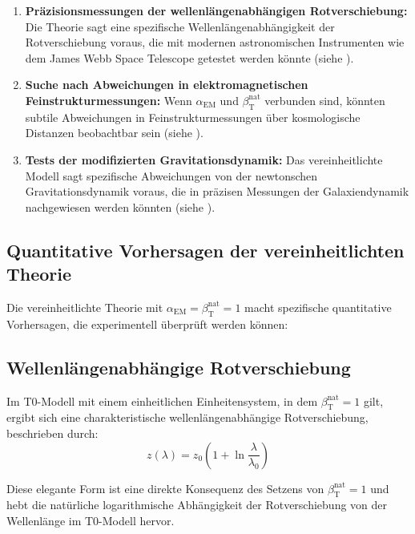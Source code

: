 \documentclass[12pt,a4paper]{article}
\newcommand{\alphaEM}{\alpha_{\text{EM}}}
\newcommand{\betaT}{\beta_{\text{T}}}
\begin{document}
	\begin{enumerate}
		\item \textbf{Präzisionsmessungen der wellenlängenabhängigen Rotverschiebung:} Die Theorie sagt eine spezifische Wellenlängenabhängigkeit der Rotverschiebung voraus, die mit modernen astronomischen Instrumenten wie dem James Webb Space Telescope getestet werden könnte (siehe \cite{pascher_messdifferenzen_2025}).
		
		\item \textbf{Suche nach Abweichungen in elektromagnetischen Feinstrukturmessungen:} Wenn \(\alphaEM\) und \(\betaT^{\text{nat}}\) verbunden sind, könnten subtile Abweichungen in Feinstrukturmessungen über kosmologische Distanzen beobachtbar sein (siehe \cite{pascher_alpha_2025}).
		
		\item \textbf{Tests der modifizierten Gravitationsdynamik:} Das vereinheitlichte Modell sagt spezifische Abweichungen von der newtonschen Gravitationsdynamik voraus, die in präzisen Messungen der Galaxiendynamik nachgewiesen werden könnten (siehe \cite{pascher_galaxies_2025}).
	\end{enumerate}
	
	\subsection{Quantitative Vorhersagen der vereinheitlichten Theorie}
	\label{subsec:quantitative_predictions}
	
	Die vereinheitlichte Theorie mit \(\alphaEM = \betaT^{\text{nat}} = 1\) macht spezifische quantitative Vorhersagen, die experimentell überprüft werden können:
	
	\subsection{Wellenlängenabhängige Rotverschiebung}
	\label{subsec:wavelength_redshift}
	
	Im T0-Modell mit einem einheitlichen Einheitensystem, in dem \(\betaT^{\text{nat}} = 1\) gilt, ergibt sich eine charakteristische wellenlängenabhängige Rotverschiebung, beschrieben durch:
	\begin{equation}
		z(\lambda) = z_0 \left(1 + \ln \frac{\lambda}{\lambda_0}\right)
	\end{equation}
	
	Diese elegante Form ist eine direkte Konsequenz des Setzens von \(\betaT^{\text{nat}} = 1\) und hebt die natürliche logarithmische Abhängigkeit der Rotverschiebung von der Wellenlänge im T0-Modell hervor.
	
\end{document}
